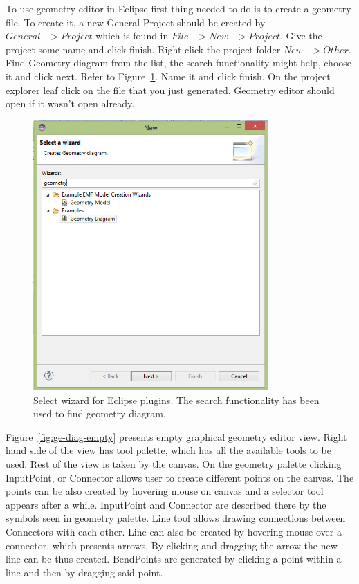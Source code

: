 To use geometry editor in Eclipse first thing needed to do is to create a geometry file. To create it, a new General Project should be created by $General->Project$ which is found in $File->New->Project$. Give the project some name and click finish. 
Right click the project folder $New->Other$. Find Geometry diagram from the list, the search functionality might help, choose it and click next. Refer to Figure~\ref{fig:ge-wiz-select}. Name it and click finish. On the project explorer leaf click on the file that you just generated. Geometry editor should open if it wasn't open already.

\begin{figure}[htp]
\begin{center}
  \includegraphics[width=0.8\textwidth]{image/ge-wiz-select.png}
  \caption{Select wizard for Eclipse plugins. The search functionality has been used to find geometry diagram.}
  \label{fig:ge-wiz-select}
\end{center}
\end{figure}

Figure~\ref{fig:ge-diag-empty} presents empty graphical geometry editor view. Right hand side of the view has tool palette, which has all the available tools to be used. Rest of the view is taken by the canvas. On the geometry palette clicking InputPoint, or Connector allows user to create different points on the canvas. The points can be also created by hovering mouse on canvas and a selector tool appears after a while. InputPoint and Connector are described there by the symbols seen in geometry palette. Line tool allows drawing connections between Connectors with each other. Line can also be created by hovering mouse over a connector, which presents arrows. By clicking and dragging the arrow the new line can be thus created. BendPoints are generated by clicking a point within a line and then by dragging said point. 

